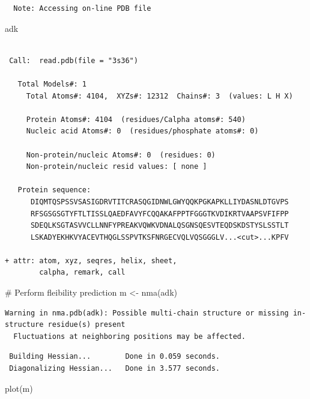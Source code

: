 \documentclass[
  letterpaper,
  DIV=11,
  numbers=noendperiod]{scrartcl}
\newenvironment{Shaded}{\begin{snugshade}}{\end{snugshade}}
\newcommand{\CommentTok}[1]{\textcolor[rgb]{0.37,0.37,0.37}{#1}}
\newcommand{\FunctionTok}[1]{\textcolor[rgb]{0.28,0.35,0.67}{#1}}
\newcommand{\NormalTok}[1]{\textcolor[rgb]{0.00,0.23,0.31}{#1}}
\newcommand{\OtherTok}[1]{\textcolor[rgb]{0.00,0.23,0.31}{#1}}
\begin{document}
\begin{verbatim}
  Note: Accessing on-line PDB file
\end{verbatim}

\begin{Shaded}
\begin{Highlighting}[]
\NormalTok{adk}
\end{Highlighting}
\end{Shaded}

\begin{verbatim}

 Call:  read.pdb(file = "3s36")

   Total Models#: 1
     Total Atoms#: 4104,  XYZs#: 12312  Chains#: 3  (values: L H X)

     Protein Atoms#: 4104  (residues/Calpha atoms#: 540)
     Nucleic acid Atoms#: 0  (residues/phosphate atoms#: 0)

     Non-protein/nucleic Atoms#: 0  (residues: 0)
     Non-protein/nucleic resid values: [ none ]

   Protein sequence:
      DIQMTQSPSSVSASIGDRVTITCRASQGIDNWLGWYQQKPGKAPKLLIYDASNLDTGVPS
      RFSGSGSGTYFTLTISSLQAEDFAVYFCQQAKAFPPTFGGGTKVDIKRTVAAPSVFIFPP
      SDEQLKSGTASVVCLLNNFYPREAKVQWKVDNALQSGNSQESVTEQDSKDSTYSLSSTLT
      LSKADYEKHKVYACEVTHQGLSSPVTKSFNRGECVQLVQSGGGLV...<cut>...KPFV

+ attr: atom, xyz, seqres, helix, sheet,
        calpha, remark, call
\end{verbatim}

\begin{Shaded}
\begin{Highlighting}[]
\CommentTok{\# Perform fleibility prediction }
\NormalTok{m }\OtherTok{\textless{}{-}} \FunctionTok{nma}\NormalTok{(adk)}
\end{Highlighting}
\end{Shaded}

\begin{verbatim}
Warning in nma.pdb(adk): Possible multi-chain structure or missing in-structure residue(s) present
  Fluctuations at neighboring positions may be affected.
\end{verbatim}

\begin{verbatim}
 Building Hessian...        Done in 0.059 seconds.
 Diagonalizing Hessian...   Done in 3.577 seconds.
\end{verbatim}

\begin{Shaded}
\begin{Highlighting}[]
\FunctionTok{plot}\NormalTok{(m)}
\end{Highlighting}
\end{Shaded}
\end{document}
